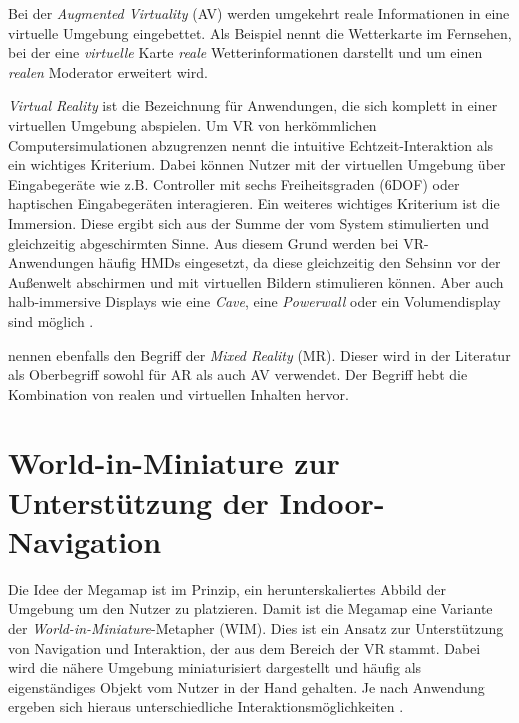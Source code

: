 Bei der \emph{Augmented Virtuality} (AV) werden umgekehrt reale Informationen in eine virtuelle Umgebung eingebettet.
Als Beispiel nennt \textcite[6]{Schroeder2017} die Wetterkarte im Fernsehen, bei der eine \emph{virtuelle} Karte \emph{reale} Wetterinformationen darstellt und um einen \emph{realen} Moderator erweitert wird.

\emph{Virtual Reality} ist die Bezeichnung für Anwendungen, die sich komplett in einer virtuellen Umgebung abspielen.
Um VR von herkömmlichen Computersimulationen abzugrenzen nennt \textcite{Zachmann2015} die intuitive Echtzeit-Interaktion als ein wichtiges Kriterium.
Dabei können Nutzer mit der virtuellen Umgebung über Eingabegeräte wie z.B. Controller mit sechs Freiheitsgraden (6DOF) oder haptischen Eingabegeräten interagieren.
Ein weiteres wichtiges Kriterium ist die Immersion.
Diese ergibt sich aus der Summe der vom System stimulierten und gleichzeitig abgeschirmten Sinne.
Aus diesem Grund werden bei VR-Anwendungen häufig HMDs eingesetzt, da diese gleichzeitig den Sehsinn vor der Außenwelt abschirmen und mit virtuellen Bildern stimulieren können.
Aber auch halb-immersive Displays wie eine \emph{Cave}, eine \emph{Powerwall} oder ein Volumendisplay sind möglich \parencite{Zachmann2015b}.

\textcite{Milgram1994} nennen ebenfalls den Begriff der \emph{Mixed Reality} (MR).
Dieser wird in der Literatur als Oberbegriff sowohl für AR als auch AV verwendet.
Der Begriff hebt die Kombination von realen und virtuellen Inhalten hervor.

\section{World-in-Miniature zur Unterstützung der Indoor-Navigation}
Die Idee der Megamap ist im Prinzip, ein herunterskaliertes Abbild der Umgebung um den Nutzer zu platzieren.
Damit ist die Megamap eine Variante der \emph{World-in-Miniature}-Metapher (WIM).
Dies ist ein Ansatz zur Unterstützung von Navigation und Interaktion, der aus dem Bereich der VR stammt.
Dabei wird die nähere Umgebung miniaturisiert dargestellt und häufig als eigenständiges Objekt vom Nutzer in der Hand gehalten.
Je nach Anwendung ergeben sich hieraus unterschiedliche Interaktionsmöglichkeiten \parencite{Stoakley1995}.


